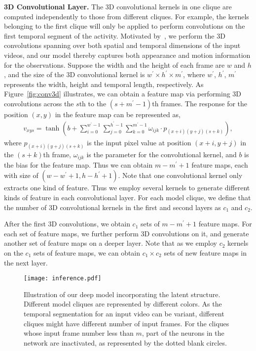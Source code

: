 \documentclass{sig-alternate}
\begin{document}
\textbf{3D Convolutional Layer.} The 3D convolutional kernels in one clique are computed independently to those from different cliques. For example, the kernels belonging to the first clique will only be applied to perform convolutions on the first temporal segment of the activity. Motivated by~\cite{3DCNNPAMI}, we perform the 3D convolutions spanning over both spatial and temporal dimensions of the input videos, and our model thereby captures both appearance and motion information for the observations. Suppose the width and the height of each frame are $w$ and $h$, and the size of the 3D convolutional kernel is $w^{\prime} \times h^{\prime} \times m^{\prime}$, where $w^{\prime}$, $h^{\prime}$, $m^{\prime}$ represents the width, height and temporal length, respectively. As Figure~\ref{fig:conv3d} illustrates, we can obtain a feature map via performing 3D convolutions across the $s$th to the $(s+m^{\prime}-1)$th frames. The response for the position $(x,y)$ in the feature map can be represented as,
\begin{eqnarray} \label{eq:3Dconv}
v_{xys} = \tanh(b + \sum_{i=0}^{w^{\prime}-1} \sum_{j=0}^{h^{\prime}-1} \sum_{k=0}^{m^{\prime}-1} \omega_{ijk} \cdot p_{(x+i)(y+j)(s+k)}),
\end{eqnarray}
where $p_{(x+i)(y+j)(s+k)}$ is the input pixel value at position $(x+i,y+j)$ in the $(s+k)$th frame, $\omega_{ijk}$ is the parameter for the convolutional kernel, and $b$ is the bias for the feature map. Thus we can obtain $m - m^{\prime} + 1$ feature maps, each with size of $(w - w^{\prime}+ 1, h - h^{\prime}+ 1)$. Note that one convolutional kernel only extracts one kind of feature. Thus we employ several kernels to generate different kinds of feature in each convolutional layer. For each model clique, we define that the number of 3D convolutional kernels in the first and second layers as $c_1$ and $c_2$.

After the first 3D convolutions, we obtain $c_1$ sets of $m - m^{\prime} + 1$ feature maps. For each set of feature maps, we further perform 3D convolutions on it, and generate another set of feature maps on a deeper layer. Note that as we employ $c_2$ kernels on the $c_1$ sets of feature maps, we can obtain $c_1 \times c_2$ sets of new feature maps in the next layer.

\begin{figure}[!htb]
\centering
\texttt{[image: inference.pdf]}
\caption{ Illustration of our deep model incorporating the latent structure. Different model cliques are represented by different colors. As the temporal segmentation for an input video can be variant, different cliques might have different number of input frames. For the cliques whose input frame number less than $m$, part of the neurons in the network are inactivated, as represented by the dotted blank circles. }\label{fig:latent_structure}
\end{figure}
\end{document}
